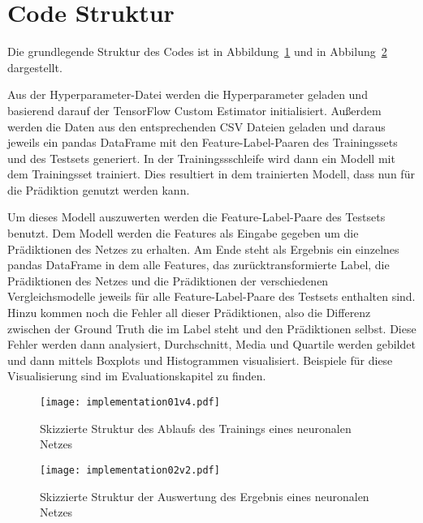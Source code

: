 
\section{Code Struktur}

Die grundlegende Struktur des Codes ist in Abbildung~\ref{fig:impl01} und in Abbilung~\ref{fig:impl02} dargestellt.

Aus der Hyperparameter-Datei werden die Hyperparameter geladen und basierend darauf der TensorFlow Custom Estimator initialisiert.
Außerdem werden die Daten aus den entsprechenden CSV Dateien geladen 
und daraus jeweils ein pandas DataFrame mit den Feature-Label-Paaren des Trainingssets und des Testsets generiert.
In der Trainingssschleife wird dann ein Modell mit dem Trainingsset trainiert.
Dies resultiert in dem trainierten Modell, dass nun für die Prädiktion genutzt werden kann.

Um dieses Modell auszuwerten werden die Feature-Label-Paare des Testsets benutzt.
Dem Modell werden die Features als Eingabe gegeben um die Prädiktionen des Netzes zu erhalten.
Am Ende steht als Ergebnis ein einzelnes pandas DataFrame in dem alle Features, das zurücktransformierte Label, 
die Prädiktionen des Netzes und die Prädiktionen der verschiedenen Vergleichsmodelle jeweils für alle Feature-Label-Paare des Testsets enthalten sind.
Hinzu kommen noch die Fehler all dieser Prädiktionen, also die Differenz zwischen der Ground Truth die im Label steht und den Prädiktionen selbst.
Diese Fehler werden dann analysiert, Durchschnitt, Media und Quartile werden gebildet und dann mittels Boxplots und Histogrammen visualisiert.
Beispiele für diese Visualisierung sind im Evaluationskapitel zu finden.



\begin{figure}[p]
    \centering
    \texttt{[image: implementation01v4.pdf]}
    \caption{Skizzierte Struktur des Ablaufs des Trainings eines neuronalen Netzes}
    \label{fig:impl01}
\end{figure}

\begin{figure}[p]
    \centering
    \texttt{[image: implementation02v2.pdf]}
    \caption{Skizzierte Struktur der Auswertung des Ergebnis eines neuronalen Netzes}
    \label{fig:impl02}
\end{figure}


